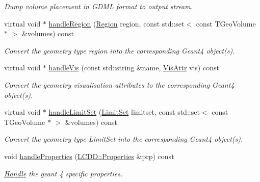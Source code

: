 \begin{DoxyCompactItemize}
\begin{DoxyCompactList}\small\item\em Dump volume placement in GDML format to output stream. \item\end{DoxyCompactList}\item 
virtual void $\ast$ \hyperlink{class_d_d4hep_1_1_simulation_1_1_geant4_converter_aa64bdf48bc89f2af20a5470f0440a59a}{handleRegion} (\hyperlink{class_d_d4hep_1_1_geometry_1_1_region}{Region} region, const std::set$<$ const TGeoVolume $\ast$ $>$ \&volumes) const 
\begin{DoxyCompactList}\small\item\em Convert the geometry type region into the corresponding Geant4 object(s). \item\end{DoxyCompactList}\item 
virtual void $\ast$ \hyperlink{class_d_d4hep_1_1_simulation_1_1_geant4_converter_ac3cb66b2af9640e210c73ef9e3411abd}{handleVis} (const std::string \&name, \hyperlink{class_d_d4hep_1_1_geometry_1_1_vis_attr}{VisAttr} vis) const 
\begin{DoxyCompactList}\small\item\em Convert the geometry visualisation attributes to the corresponding Geant4 object(s). \item\end{DoxyCompactList}\item 
virtual void $\ast$ \hyperlink{class_d_d4hep_1_1_simulation_1_1_geant4_converter_ab2b11fdbfec73e218a533bb84f998679}{handleLimitSet} (\hyperlink{class_d_d4hep_1_1_geometry_1_1_limit_set}{LimitSet} limitset, const std::set$<$ const TGeoVolume $\ast$ $>$ \&volumes) const 
\begin{DoxyCompactList}\small\item\em Convert the geometry type LimitSet into the corresponding Geant4 object(s). \item\end{DoxyCompactList}\item 
void \hyperlink{class_d_d4hep_1_1_simulation_1_1_geant4_converter_a18399813135c4547ae465e75dc620a8f}{handleProperties} (\hyperlink{class_d_d4hep_1_1_geometry_1_1_l_c_d_d_a89096744868821bf5dcb0c0560b348c9}{LCDD::Properties} \&prp) const 
\begin{DoxyCompactList}\small\item\em \hyperlink{class_d_d4hep_1_1_handle}{Handle} the geant 4 specific properties. \item\end{DoxyCompactList}\item 

\end{DoxyCompactItemize}
